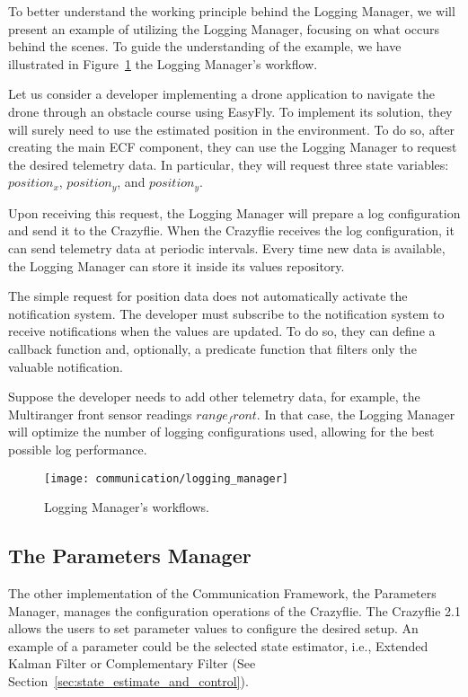 To better understand the working principle behind the Logging Manager, we will present an example of utilizing the Logging Manager, focusing on what occurs behind the scenes.
To guide the understanding of the example, we have illustrated in Figure~\ref{fig:logging_manager} the Logging Manager's workflow.

Let us consider a developer implementing a drone application to navigate the drone through an obstacle course using EasyFly.
To implement its solution, they will surely need to use the estimated position in the environment. 
To do so, after creating the main ECF component, they can use the Logging Manager to request the desired telemetry data.
In particular, they will request three state variables: \( position_x \), \( position_y \), and \( position_y \).

Upon receiving this request, the Logging Manager will prepare a log configuration and send it to the Crazyflie.
When the Crazyflie receives the log configuration, it can send telemetry data at periodic intervals.
Every time new data is available, the Logging Manager can store it inside its values repository.

The simple request for position data does not automatically activate the notification system.
The developer must subscribe to the notification system to receive notifications when the values are updated.
To do so, they can define a callback function and, optionally, a predicate function that filters only the valuable notification.

Suppose the developer needs to add other telemetry data, for example, the Multiranger front sensor readings \( range_front \). 
In that case, the Logging Manager will optimize the number of logging configurations used, allowing for the best possible log performance.

\begin{figure}[tb]
    \centering
    \texttt{[image: communication/logging\_manager]}
    \caption{Logging Manager's workflows.}\label{fig:logging_manager}
\end{figure}

\pagebreak%

\subsection{The Parameters Manager}\label{subsec:parameter_manager}

The other implementation of the Communication Framework, the Parameters Manager, manages the configuration operations of the Crazyflie.
The Crazyflie 2.1 allows the users to set parameter values to configure the desired setup. 
An example of a parameter could be the selected state estimator, i.e., Extended Kalman Filter or Complementary Filter (See Section~\ref{sec:state_estimate_and_control}).


